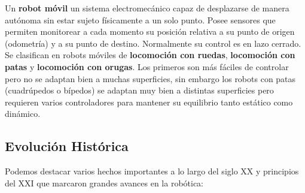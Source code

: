 Un \textbf{robot móvil} un sistema electromecánico capaz de desplazarse de ma­nera autónoma sin estar sujeto físicamente a un solo punto. Posee sensores que permiten monitorear a cada momento su posición relativa a su punto de origen (odometría) y a su punto de destino. Normalmente su control es en lazo cerrado. Se clasifican en robots móviles de \textbf{locomoción con ruedas}, \textbf{locomoción con patas} y \textbf{locomoción con orugas}.  Los primeros son más fáciles de controlar pero no se adaptan bien a muchas superficies, sin embargo los robots con patas (cuadrúpedos o bípedos) se adaptan muy bien a distintas superficies pero requieren varios controladores para mantener su equilibrio tanto estático como dinámico.




\subsection{Evolución Histórica}
\label{subsec:evolucion_historica}

Podemos destacar varios hechos importantes a lo largo del siglo XX y principios del XXI que 
marcaron grandes avances en la robótica:

